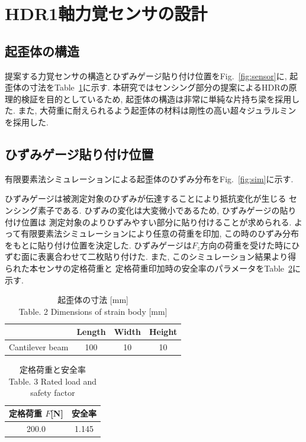 \section{HDR1軸力覚センサの設計}
\subsection{起歪体の構造}
提案する力覚センサの構造とひずみゲージ貼り付け位置をFig.~\ref{fig:sensor}に, 
起歪体の寸法をTable~\ref{tb:size}に示す.
本研究ではセンシング部分の提案によるHDRの原理的検証を目的としているため, 
起歪体の構造は非常に単純な片持ち梁を採用した. 
また, 大荷重に耐えられるよう起歪体の材料は剛性の高い超々ジュラルミンを採用した. 

\subsection{ひずみゲージ貼り付け位置}
有限要素法シミュレーションによる起歪体のひずみ分布をFig.~\ref{fig:sim}に示す.

ひずみゲージは被測定対象のひずみが伝達することにより抵抗変化が生じる
センシング素子である. 
ひずみの変化は大変微小であるため, ひずみゲージの貼り付け位置は
測定対象のよりひずみやすい部分に貼り付けることが求められる. 
よって有限要素法シミュレーションにより任意の荷重を印加, 
この時のひずみ分布をもとに貼り付け位置を決定した. 
ひずみゲージは$F_z$方向の荷重を受けた時にひずむ面に表裏合わせて二枚貼り付けた. 
また, このシミュレーション結果より得られた本センサの定格荷重と
定格荷重印加時の安全率のパラメータをTable~\ref{tb:kajuu}に示す.
\begin{table}[h]
  \caption{起歪体の寸法 [mm]\\Table. 2 Dimensions of strain body [mm]}\label{tb:size}
  \begin{center}
   \begin{tabular}{ c c c c }
    \hline
     & Length & Width & Height  \\
    \hline
    Cantilever beam & 100 & 10 & 10  \\
    \hline   
   \end{tabular}
  \end{center}
 \end{table}
\begin{table}[h]
  \caption{定格荷重と安全率\\Table. 3 Rated load and safety factor}\label{tb:kajuu}
  \begin{center}
   \begin{tabular}{ c c }
    \hline
    定格荷重 $F$[N] & 安全率 \\
    \hline
    200.0 & 1.145 \\
    \hline   
   \end{tabular}
  \end{center}
 \end{table}

